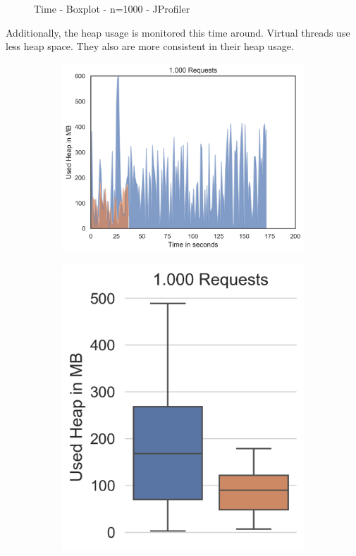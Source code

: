 \begin{figure}[H]
\begin{subfigure}[b]{0.45\textwidth}
  \end{subfigure}
  \caption{Time - Boxplot - n=1000 - JProfiler}
\end{figure}


Additionally, the heap usage is monitored this time around. Virtual threads use less heap space. They also are more consistent in their heap usage.


\begin{figure}[H]
  \centering
  \begin{subfigure}[b]{0.45\textwidth}
    \includegraphics[width=1.0\linewidth]{img/footprint/heap_1000_line.png}
  \end{subfigure}
  \begin{subfigure}[b]{0.3\textwidth}
    \includegraphics[width=1.0\linewidth]{img/footprint/heap_1000_box.png}

\end{subfigure}
\end{figure}
